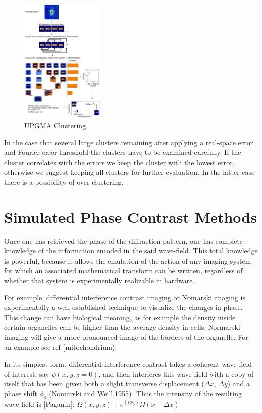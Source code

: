 \begin{figure}[h]\label{fig:UPGMA}
\centering 
\includegraphics[width=40mm]{UPGMA_Clustering.jpg}
\caption{UPGMA Clustering.}
\end{figure}

In the case that several large clusters remaining after applying a real-space error and Fourier-error threshold the clusters have to be examined carefully. If the cluster correlates with the errors we keep the cluster with the lowest error, otherwise we suggest keeping all clusters for further evaluation. In the latter case there is a possibility of over clustering.

 
\section{Simulated Phase Contrast Methods}
Once one has retrieved the phase of the diffraction pattern, one has complete knowledge of the information encoded in the said wave-field. This total knowledge is powerful, because it allows the emulation of the action of any imaging system for which an associated mathematical transform can be written, regardless of whether that system is experimentally realizable in hardware.

For example, differential interference contrast imaging or Nomarski imaging is experimentally a well established technique to visualize the changes in phase. This change can have biological meaning, as for example the density inside certain organelles can be higher than the average density in cells. Normarski imaging will give a more pronounced image of the borders of the organelle. For an example see ref [mitochondrium). 

In its simplest form, differential interference contrast takes a coherent wave-field of interest, say $\psi(x,y,z = 0)$, and then interferes this wave-field with a copy of itself that has been given both a slight transverse displacement ($\Delta x$, $\Delta y$) and a phase shift $\phi_0$ (Nomarski and Weill,1955). Thus the intensity of the resulting wave-field is [Paganin]:
$\Omega(x,y,z)+ e^{(i\phi_0)} \Omega(x - \Delta x)$%

